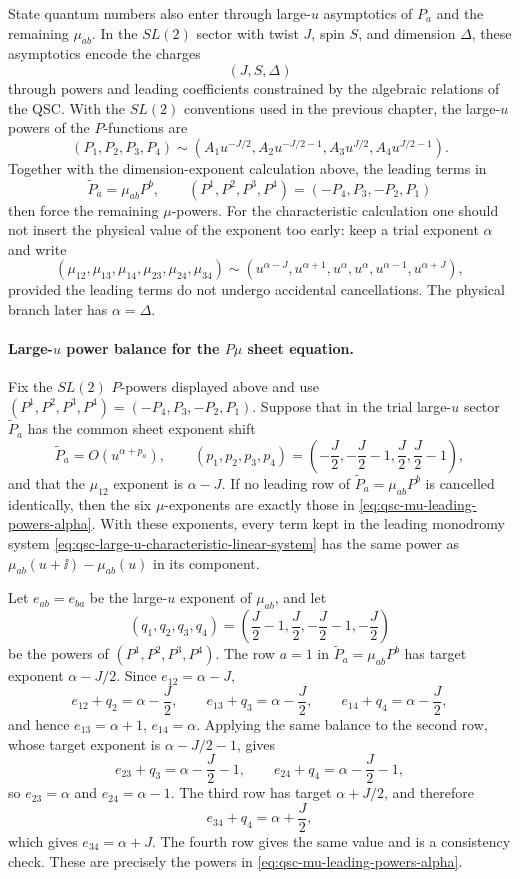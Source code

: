 State quantum numbers also enter through large-\(u\) asymptotics of \(P_a\)
and the remaining \(\mu_{ab}\).  In the \(SL(2)\) sector with twist \(J\),
spin \(S\), and dimension \(\Delta\), these asymptotics encode the charges
\[
  (J,S,\Delta)
\]
through powers and leading coefficients constrained by the algebraic
relations of the QSC.
With the \(SL(2)\) conventions used in the previous chapter, the large-\(u\)
powers of the \(P\)-functions are
\[
  (P_1,P_2,P_3,P_4)
  \sim
  (A_1u^{-J/2},A_2u^{-J/2-1},A_3u^{J/2},A_4u^{J/2-1}).
\]
Together with the dimension-exponent calculation above, the leading
terms in
\[
  \widetilde P_a=\mu_{ab}P^b,\qquad
  (P^1,P^2,P^3,P^4)=(-P_4,P_3,-P_2,P_1)
\]
then force the remaining \(\mu\)-powers.  For the characteristic calculation
one should not insert the physical value of the exponent too early: keep a
trial exponent \(\alpha\) and write
\begin{equation}
  (\mu_{12},\mu_{13},\mu_{14},\mu_{23},\mu_{24},\mu_{34})
  \sim
  (u^{\alpha-J},u^{\alpha+1},u^\alpha,u^\alpha,
    u^{\alpha-1},u^{\alpha+J}),
  \label{eq:qsc-mu-leading-powers-alpha}
\end{equation}
provided the leading terms do not undergo accidental cancellations.  The
physical branch later has \(\alpha=\Delta\).

\paragraph{Large-\(u\) power balance for the \(P\mu\) sheet equation.}
Fix the \(SL(2)\) \(P\)-powers displayed above and use
\((P^1,P^2,P^3,P^4)=(-P_4,P_3,-P_2,P_1)\).  Suppose that in the trial
large-\(u\) sector \(\widetilde P_a\) has the common sheet exponent shift
\[
  \widetilde P_a=O(u^{\alpha+p_a}),
  \qquad
  (p_1,p_2,p_3,p_4)=
  \left(-\frac J2,-\frac J2-1,\frac J2,\frac J2-1\right),
\]
and that the \(\mu_{12}\) exponent is \(\alpha-J\).  If no leading row of
\(\widetilde P_a=\mu_{ab}P^b\) is cancelled identically, then the six
\(\mu\)-exponents are exactly those in
\eqref{eq:qsc-mu-leading-powers-alpha}.  With these exponents, every term
kept in the leading monodromy system
\eqref{eq:qsc-large-u-characteristic-linear-system} has the same power as
\(\mu_{ab}(u+\ii)-\mu_{ab}(u)\) in its component.

Let \(e_{ab}=e_{ba}\) be the large-\(u\) exponent of \(\mu_{ab}\), and let
\[
  (q_1,q_2,q_3,q_4)=
  \left(\frac J2-1,\frac J2,-\frac J2-1,-\frac J2\right)
\]
be the powers of \((P^1,P^2,P^3,P^4)\).  The row \(a=1\) in
\(\widetilde P_a=\mu_{ab}P^b\) has target exponent
\(\alpha-J/2\).  Since \(e_{12}=\alpha-J\),
\[
  e_{12}+q_2=\alpha-\frac J2,\qquad
  e_{13}+q_3=\alpha-\frac J2,\qquad
  e_{14}+q_4=\alpha-\frac J2,
\]
and hence \(e_{13}=\alpha+1\), \(e_{14}=\alpha\).  Applying the same balance
to the second row, whose target exponent is \(\alpha-J/2-1\), gives
\[
  e_{23}+q_3=\alpha-\frac J2-1,\qquad
  e_{24}+q_4=\alpha-\frac J2-1,
\]
so \(e_{23}=\alpha\) and \(e_{24}=\alpha-1\).  The third row has target
\(\alpha+J/2\), and therefore
\[
  e_{34}+q_4=\alpha+\frac J2,
\]
which gives \(e_{34}=\alpha+J\).  The fourth row gives the same value and is
a consistency check.  These are precisely the powers in
\eqref{eq:qsc-mu-leading-powers-alpha}.

